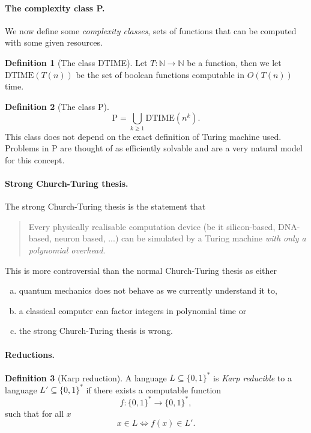\documentclass[11pt,a4paper]{article}
\theoremstyle{definition}
\newtheorem{defn}{Definition}
\newcommand{\NN}{\mathbb{N}}
\begin{document}
\paragraph{The complexity class P.}
We now define some \emph{complexity classes}, sets of functions that can be computed with some given resources.
\begin{defn}[The class DTIME]
Let $T\colon \NN\to\NN$ be a function, then we let $\text{DTIME}(T(n))$ be the set of boolean functions computable in $O(T(n))$ time.
\end{defn}
\begin{defn}[The class P]
\[
\text{P} = \bigcup_{k\ge 1} \text{DTIME}(n^k).
\]
This class does not depend on the exact definition of Turing machine used.
Problems in P are thought of as efficiently solvable and are a very natural model for this concept.
\end{defn}

\paragraph{Strong Church-Turing thesis.}
The strong Church-Turing thesis is the statement that
\begin{quote}
Every physically realisable computation device (be it silicon-based, DNA-based, neuron based, ...) can be simulated by a Turing machine \emph{with only a polynomial overhead}.
\end{quote}
This is more controversial than the normal Church-Turing thesis as either
\begin{enumerate}[a)]
\item quantum mechanics does not behave as we currently understand it to,
\item a classical computer can factor integers in polynomial time or
\item the strong Church-Turing thesis is wrong.
\end{enumerate}

\paragraph{Reductions.}
\begin{defn}[Karp reduction]
A language $L\subseteq\{0,1\}^*$ is \emph{Karp reducible} to a language $L'\subseteq \{0,1\}^*$ if there exists a computable function 
\[
f\colon \{0,1\}^* \to \{0,1\}^*,
\]
such that for all $x$ 
\[
x\in L \iff f(x) \in L'.
\]
\end{defn}
\end{document}
